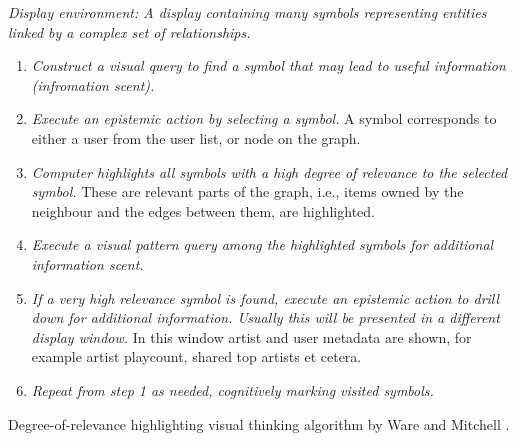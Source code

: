 \begin{table}
	\textit{Display environment: A display containing many symbols representing entities linked by a complex set of relationships.}

	\begin{enumerate}
		\item \textit{Construct a visual query to find a symbol that may lead to useful information (infromation scent).}
		\item \textit{Execute an epistemic action by selecting a symbol.} A symbol corresponds to either a user from the user list, or node on the graph.
		\item \textit{Computer highlights all symbols with a high degree of relevance to the selected symbol.} These are relevant parts of the graph, i.e., items owned by the neighbour and the edges between them, are highlighted.
		\item \textit{Execute a visual pattern query among the highlighted symbols for additional information scent.}
		\item \textit{If a very high relevance symbol is found, execute an epistemic action to drill down for additional information. Usually this will be presented in a different display window.} In this window artist and user metadata are shown, for example artist playcount, shared top artists et cetera.
		\item \textit{Repeat from step 1 as needed, cognitively marking visited symbols.}
	\end{enumerate}
\caption{Degree-of-relevance highlighting visual thinking algorithm by Ware and Mitchell \cite{ware:2004}.}
\label{table:visual_thinking_algorithm}
\end{table}





